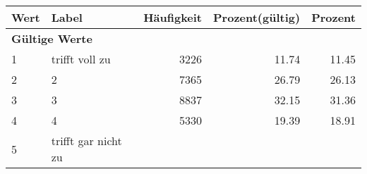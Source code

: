      \begin{longtable}{lXrrr}
     \toprule
     \textbf{Wert} & \textbf{Label} & \textbf{Häufigkeit} & \textbf{Prozent(gültig)} & \textbf{Prozent} \\
     \endhead
     \midrule
     \multicolumn{5}{l}{\textbf{Gültige Werte}}\\

     1 &
     \multicolumn{1}{X}{ trifft voll zu   } &


       \num{3226} &
       \num[round-mode=places,round-precision=2]{11.74} &
         \num[round-mode=places,round-precision=2]{11.45} \\

     2 &
     \multicolumn{1}{X}{ 2   } &


       \num{7365} &
       \num[round-mode=places,round-precision=2]{26.79} &
         \num[round-mode=places,round-precision=2]{26.13} \\

     3 &
     \multicolumn{1}{X}{ 3   } &


       \num{8837} &
       \num[round-mode=places,round-precision=2]{32.15} &
         \num[round-mode=places,round-precision=2]{31.36} \\

     4 &
     \multicolumn{1}{X}{ 4   } &


       \num{5330} &
       \num[round-mode=places,round-precision=2]{19.39} &
         \num[round-mode=places,round-precision=2]{18.91} \\

     5 &
     \multicolumn{1}{X}{ trifft gar nicht zu   } &



\end{longtable}
